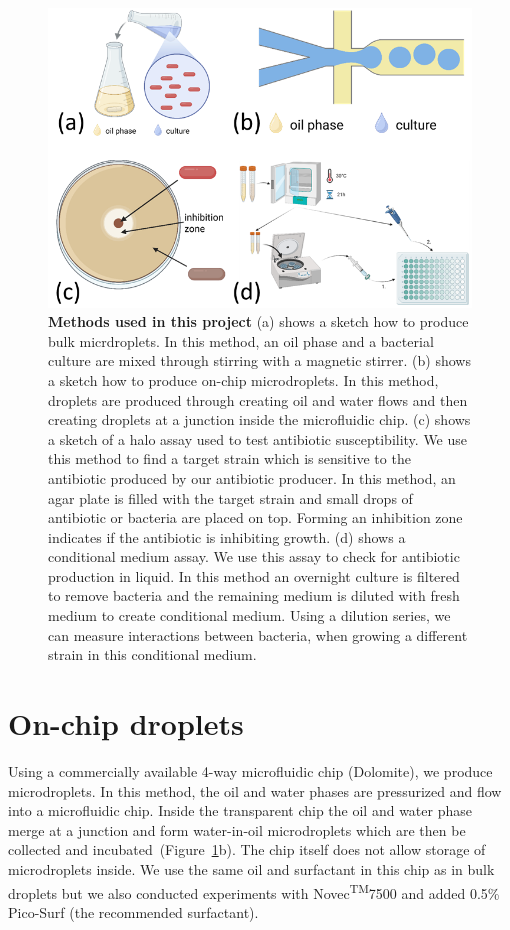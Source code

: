\begin{figure}
\centering
\includegraphics[width=\linewidth]{graphics/2025_09_28_droplets_fig2.png}
\caption{\textbf{Methods used in this project} (a) shows a sketch how to produce bulk micrdroplets. In this method, an oil phase and a bacterial culture are mixed through stirring with a magnetic stirrer. (b) shows a sketch how to produce on-chip microdroplets. In this method, droplets are produced through creating oil and water flows and then creating droplets at a junction inside the microfluidic chip. (c) shows a sketch of a halo assay used to test antibiotic susceptibility. We use this method to find a target strain which is sensitive to the antibiotic produced by our antibiotic producer. In this method, an agar plate is filled with the target strain and small drops of antibiotic or bacteria are placed on top. Forming an inhibition zone indicates if the antibiotic is inhibiting growth. (d) shows a conditional medium assay. We use this assay to check for antibiotic production in liquid. In this method an overnight culture is filtered to remove bacteria and the remaining medium is diluted with fresh medium to create conditional medium. Using a dilution series, we can measure interactions between bacteria, when growing a different strain in this conditional medium.}
\label{fig:method_droplet_experiments}
\end{figure}

\section{On-chip droplets}
Using a commercially available 4-way microfluidic chip (Dolomite), we produce microdroplets. In this method, the oil and water phases are pressurized and flow into a microfluidic chip. Inside the transparent chip the oil and water phase merge at a junction and form water-in-oil microdroplets which are then be collected and incubated~(Figure~\ref{fig:method_droplet_experiments}b). The chip itself does not allow storage of microdroplets inside. We use the same oil and surfactant in this chip as in bulk droplets but we also conducted experiments with Novec\textsuperscript{TM}7500 and added 0.5\% Pico-Surf{\textregistered} (the recommended surfactant).

